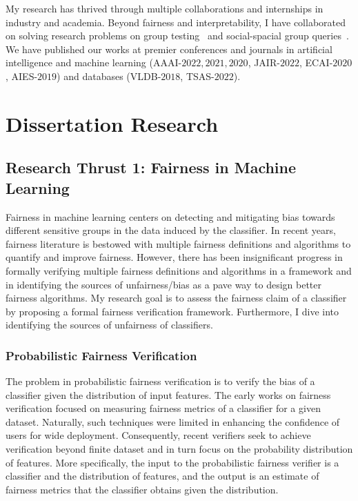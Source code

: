 \documentclass[11pt]{article}
\begin{document}
	
	My research has thrived through multiple collaborations and internships in industry and academia. Beyond fairness and interpretability, I have collaborated on solving research problems on  group testing~\cite{ciampiconi2020maxsat} and social-spacial group queries~\cite{ghosh2018flexible,apon2021social}. We have published our works at premier conferences and journals in artificial intelligence and machine learning (AAAI-$ 2022, 2021, 2020 $, JAIR-$ 2022 $, ECAI-$ 2020 $, AIES-$ 2019 $) and databases (VLDB-$ 2018 $, TSAS-$ 2022 $).
	
	
	
	
	
	\section*{Dissertation Research}
	
	\subsection*{Research Thrust 1: Fairness in Machine Learning}
	
	Fairness in machine learning centers on detecting and mitigating bias towards different sensitive groups in the data induced by the classifier. In recent years, fairness literature is bestowed with multiple fairness definitions and algorithms to quantify and improve fairness. However, there has been insignificant progress in formally verifying multiple fairness definitions and algorithms in a framework and in identifying the sources of unfairness/bias as a pave way to design better fairness algorithms. My research goal is to assess the fairness claim of a classifier by proposing a formal fairness verification framework. Furthermore, I dive into identifying the sources of unfairness of classifiers.
	
	\subsubsection*{Probabilistic Fairness Verification} The problem in probabilistic fairness verification is to verify the bias of a classifier given the distribution of input features. The early works on fairness verification focused on measuring fairness metrics of a classifier for a given dataset. Naturally, such techniques were limited in enhancing the confidence of users for wide deployment. Consequently, recent verifiers seek to achieve verification beyond  finite dataset and in turn focus on the  probability distribution of features. More specifically, the input to the probabilistic fairness verifier is a classifier and  the distribution of features, and the output is an estimate of fairness metrics that the classifier obtains given the distribution.
	
\end{document}
